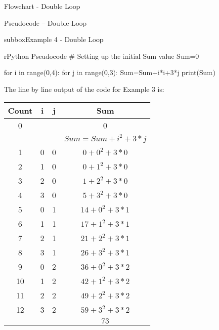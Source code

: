 \documentclass[10pt,a4paper]{article}
\begin{document}
\begin{multicols}{3}
\begin{textbox}{Flowchart - Double Loop}
\end{textbox}
\begin{textbox}{Pseudocode -- Double Loop}
\begin{subbox}{subbox}{Example 4 - Double Loop}
\begin{codebox}{r}{Python Pseudocode}
# Setting up the initial Sum value
Sum=0

for i in range(0,4):
    for j in range(0,3):
        Sum=Sum+i*i+3*j
print(Sum)

\end{codebox}
The line by line output of the code for Example 3 is:
\begin{center}
\begin{tabular}{ c| c| c |c}
 Count &i &j & Sum \\ \hline
 0 & &  & 0  \\
 \hline
  & &  & $Sum=Sum+i^2+3*j$  \\
 \hline
 1&0&0 & $0+0^2+3*0 $ \\
 2&1&0 & $0+1^2+3*0 $  \\
 3&2&0 & $1+2^2+3*0 $  \\
 4&3&0 & $5+3^2+3*0 $  \\
 5&0&1 & $14+0^2+3*1 $ \\
 6&1&1 & $17+1^2+3*1 $  \\
 7&2&1 & $21+2^2+3*1 $  \\
 8&3&1& $26+3^2+3*1 $  \\
 9&0&2 & $36+0^2+3*2 $ \\
 10&1&2 & $42+1^2+3*2 $  \\
 11&2&2 & $49+2^2+3*2 $  \\
 12&3&2& $59+3^2+3*2 $  \\
 \hline
 & & & $73 $  \\
\end{tabular}
\end{center}
\end{subbox}
\end{textbox}



\end{multicols}

\newpage
\end{document}
